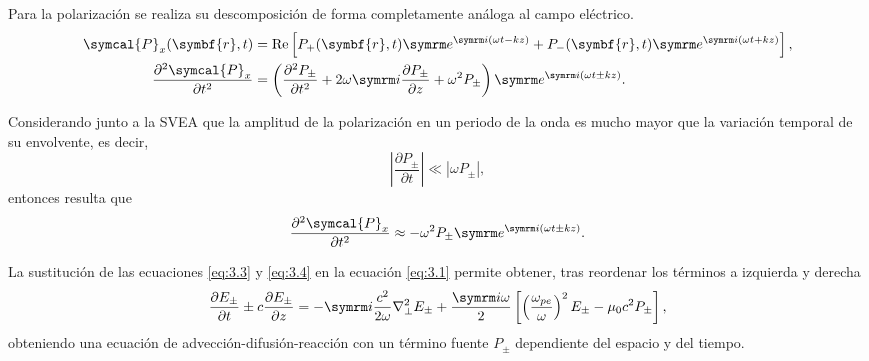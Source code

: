 Para la polarización se realiza su descomposición de forma completamente análoga al campo eléctrico.
\begin{align}
    \symcal{P}_x(\symbf{r},t) 
    &=
    \RE\left[P_+(\symbf{r},t)\eu^{\iu(\omega t - kz)}+P_-(\symbf{r},t)\eu^{\iu(\omega t + kz)}\right], \\
    \frac{\partial^2 \symcal{P}_x}{\partial t^2}
    &=
    \left(\frac{\partial^2 P_{\pm}}{\partial t^2} + 2\omega\iu\frac{\partial P_{\pm}}{\partial z} + \omega^2P_{\pm}\right)\eu^{\iu(\omega t \pm kz)}.
\end{align}

Considerando junto a la SVEA que la amplitud de la polarización en un periodo de la onda es mucho mayor que la variación temporal de su envolvente, es decir,
\begin{equation}
    \left|\frac{\partial P_{\pm}}{\partial t}\right| \ll |\omega P_{\pm}|,
\end{equation}
\noindent
entonces resulta que
\begin{equation}\label{eq:3.4}
     \frac{\partial^2 \symcal{P}_x}{\partial t^2}
     \approx
     - \omega^2P_{\pm}\eu^{\iu(\omega t \pm kz)}.
\end{equation}

La sustitución de las ecuaciones \eqref{eq:3.3} y \eqref{eq:3.4} en la ecuación \eqref{eq:3.1} permite obtener, tras reordenar los términos a izquierda y derecha
\begin{equation}
    \frac{\partial E_{\pm}}{\partial t} \pm c\frac{\partial E_{\pm}}{\partial z}
    =
    -\iu\frac{c^2}{2\omega}\grad^2_{\perp}E_{\pm} + \frac{\iu\omega}{2}\left[\left(\frac{\omega_{pe}}{\omega}\right)^2E_{\pm} - \mu_0c^2P_{\pm}\right],
\end{equation}
\noindent
obteniendo una ecuación de advección-difusión-reacción con un término fuente $P_{\pm}$ dependiente del espacio y del tiempo. 

